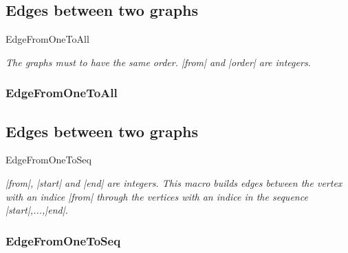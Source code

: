 \newpage
\subsection{Edges between two graphs }
\begin{NewMacroBox}{EdgeFromOneToAll}{}

\medskip
\emph{The graphs must to have the same order. |from| and |order| are integers.}
\end{NewMacroBox}

\subsubsection{EdgeFromOneToAll}
\begin{center}
\begin{tkzexample}
\end{tkzexample}
\end{center}

\newpage
\subsection{Edges between two graphs }
\begin{NewMacroBox}{EdgeFromOneToSeq}{}

\medskip
\emph{|from|, |start| and |end| are integers. This macro  builds edges between the vertex with an indice |from| through the vertices with an indice in the sequence |start|,...,|end|.}
\end{NewMacroBox}

\subsubsection{EdgeFromOneToSeq}
\begin{center}
\begin{tkzexample}
\end{tkzexample}
\end{center}

